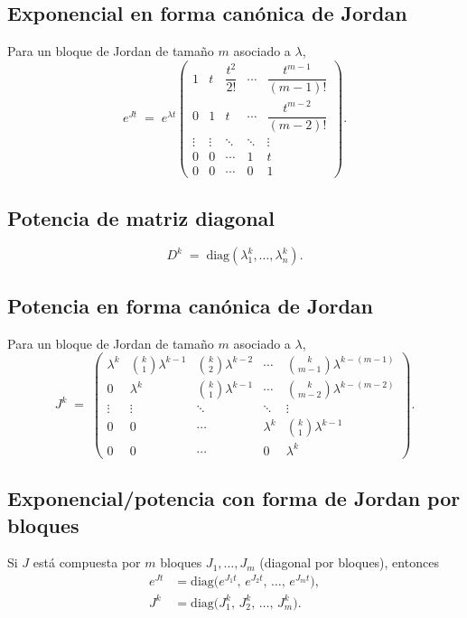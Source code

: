 \documentclass[
  11pt,
  letterpaper,
   addpoints,
  answers
  ]{exam}
\begin{document}
\subsection*{Exponencial en forma canónica de Jordan}
Para un bloque de Jordan de tamaño $m$ asociado a $\lambda$,
\begin{equation}
  e^{J t} \;=\; e^{\lambda t}
  \begin{pmatrix}
    1 & t & \dfrac{t^2}{2!} & \cdots & \dfrac{t^{m-1}}{(m-1)!} \\
    0 & 1 & t & \cdots & \dfrac{t^{m-2}}{(m-2)!} \\
    \vdots & \vdots & \ddots & \ddots & \vdots \\
    0 & 0 & \cdots & 1 & t \\
    0 & 0 & \cdots & 0 & 1
  \end{pmatrix}.
\end{equation}

\subsection*{Potencia de matriz diagonal}
\begin{equation}
  D^{k} \;=\; \mathrm{diag}\left(\lambda_1^{k},\dots,\lambda_n^{k}\right).
\end{equation}

\subsection*{Potencia en forma canónica de Jordan}
Para un bloque de Jordan de tamaño $m$ asociado a $\lambda$,
\begin{equation}
  J^{k} \;=\;
  \begin{pmatrix}
    \lambda^{k} & \binom{k}{1}\lambda^{k-1} & \binom{k}{2}\lambda^{k-2} & \cdots & \binom{k}{m-1}\lambda^{k-(m-1)}\\
    0 & \lambda^{k} & \binom{k}{1}\lambda^{k-1} & \cdots & \binom{k}{m-2}\lambda^{k-(m-2)}\\
    \vdots & \vdots & \ddots & \ddots & \vdots\\
    0 & 0 & \cdots & \lambda^{k} & \binom{k}{1}\lambda^{k-1}\\
    0 & 0 & \cdots & 0 & \lambda^{k}
  \end{pmatrix}.
\end{equation}

\subsection*{Exponencial/potencia con forma de Jordan por bloques}
Si $J$ está compuesta por $m$ bloques $J_1,\dots,J_m$ (diagonal por bloques), entonces
\begin{align}
  e^{J t} &= \mathrm{diag}\!\big(e^{J_1 t},\,e^{J_2 t},\,\dots,\,e^{J_m t}\big),\\
  J^{k} &= \mathrm{diag}\!\big(J_1^{k},\,J_2^{k},\,\dots,\,J_m^{k}\big).
\end{align}
\end{document}
